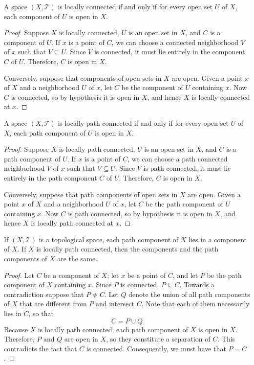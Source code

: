 \documentclass[12pt, a4paper, oneside, openright, titlepage]{book}
\begin{document}
\begin{theorem}
    A space $(X,\mathcal{T})$ is locally connected if and only if for every open set $U$ of $X$, each component of $U$ is open in $X$.
\end{theorem}
\begin{proof}
    Suppose $X$ is locally connected, $U$ is an open set in $X$, and $C$ is a component of $U$. If $x$ is a point of $C$, we can choose a connected neighborhood $V$ of $x$ such that $V \subseteq U$. Since $V$ is connected, it must lie entirely in the component $C$ of $U$. Therefore, $C$ is open in $X$.

    Conversely, suppose that components of open sets in $X$ are open. Given a point $x$ of $X$ and a neighborhood $U$ of $x$, let $C$ be the component of $U$ containing $x$. Now $C$ is connected, so by hypothesis it is open in $X$, and hence $X$ is locally connected at $x$.
\end{proof}

\begin{theorem}
    A space $(X,\mathcal{T})$ is locally path connected if and only if for every open set $U$ of $X$, each path component of $U$ is open in $X$.
\end{theorem}
\begin{proof}
    Suppose $X$ is locally path connected, $U$ is an open set in $X$, and $C$ is a path component of $U$. If $x$ is a point of $C$, we can choose a path connected neighborhood $V$ of $x$ such that $V \subseteq U$. Since $V$ is path connected, it must lie entirely in the path component $C$ of $U$. Therefore, $C$ is open in $X$.

    Conversely, suppose that path components of open sets in $X$ are open. Given a point $x$ of $X$ and a neighborhood $U$ of $x$, let $C$ be the path component of $U$ containing $x$. Now $C$ is path connected, so by hypothesis it is open in $X$, and hence $X$ is locally path connected at $x$.
\end{proof}


\begin{theorem}
    If $(X,\mathcal{T})$ is a topological space, each path component of $X$ lies in a component of $X$. If $X$ is locally path connected, then the components and the path components of $X$ are the same.
\end{theorem}
\begin{proof}
    Let $C$ be a component of $X$; let $x$ be a point of $C$, and let $P$ be the path component of $X$ containing $x$. Since $P$ is connected, $P\subseteq C$. Towards a contradiction suppose that $P \neq C$. Let $Q$ denote the union of all path components of $X$ that are different from $P$ and intersect $C$. Note that each of them necessarily lies in $C$, so that \begin{equation*}
        C = P\cup Q
    \end{equation*}
    Because $X$ is locally path connected, each path component of $X$ is open in $X$. Therefore, $P$ and $Q$ are open in $X$, so they constitute a separation of $C$. This contradicts the fact that $C$ is connected. Consequently, we must have that $P = C$.
\end{proof}
\end{document}
